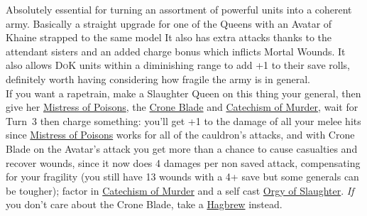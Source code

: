 Absolutely essential for turning an assortment of powerful units into
a coherent army.  Basically a straight upgrade for one of the Queens with an
Avatar of Khaine strapped to the same model It also has extra attacks thanks to
the attendant sisters and an added charge bonus which inflicts Mortal Wounds.
It also allows \textsc{DoK} units within a diminishing range to add +1 to their
save rolls, definitely worth having considering how fragile the army is in
general.\\

If you want a rapetrain, make a Slaughter Queen on this thing
your general, then give her \hyperref[mistress-of-poisons]{Mistress of
Poisons}, the \hyperref[crone-blade]{Crone Blade} and
\hyperref[catechism-of-murder]{Catechism of Murder}, wait for Turn~3 then
charge something: you'll get +1 to the damage of all your melee hits since
\hyperref[mistress-of-poisons]{Mistress of Poisons} works for all of the
cauldron's attacks, and with Crone Blade on the Avatar's attack you get
more than a chance to cause casualties and recover wounds, since it now
does 4 damages per non saved attack, compensating for your fragility (you
still have 13 wounds with a 4+ save but some generals can be tougher);
factor in \hyperref[catechism-of-murder]{Catechism of Murder} and a self
cast \hyperref[orgy-of-slaughter]{Orgy of Slaughter}. \emph{If} you don't
care about the Crone Blade, take a \hyperref[hagbrew]{Hagbrew} instead.\\



